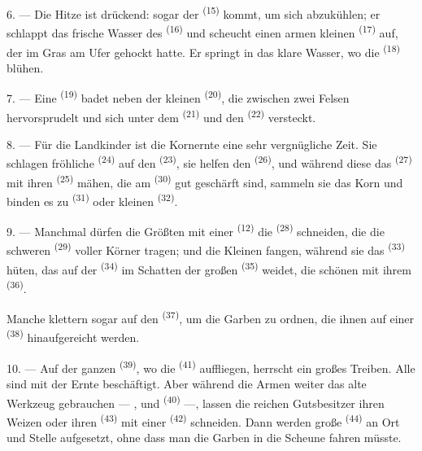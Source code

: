 6. --- Die Hitze ist drückend: sogar der  \textsuperscript{(15)} kommt,
um sich abzukühlen; er schlappt das frische Wasser des 
\textsuperscript{(16)} und scheucht einen armen kleinen 
\textsuperscript{(17)} auf, der im Gras am Ufer gehockt hatte. Er springt in das
klare Wasser, wo die  \textsuperscript{(18)} blühen.

7. --- Eine  \textsuperscript{(19)} badet neben der kleinen
 \textsuperscript{(20)}, die zwischen zwei Felsen hervorsprudelt und
sich unter dem  \textsuperscript{(21)} und den
 \textsuperscript{(22)} versteckt.

\VUsaut{5.0mm}
\VUsaut{3.4mm}

8. --- Für die Landkinder ist die Kornernte eine sehr vergnügliche Zeit. Sie
schlagen fröhliche  \textsuperscript{(24)} auf den
 \textsuperscript{(23)}, sie helfen den 
\textsuperscript{(26)}, und während diese das 
\textsuperscript{(27)} mit ihren  \textsuperscript{(25)} mähen, die am
 \textsuperscript{(30)} gut geschärft sind, sammeln sie das Korn
und binden es zu  \textsuperscript{(31)} oder kleinen
 \textsuperscript{(32)}.

9. --- Manchmal dürfen die Größten mit einer  \textsuperscript{(12)}
die  \textsuperscript{(28)} schneiden, die die schweren
 \textsuperscript{(29)} voller Körner tragen; und die Kleinen fangen,
während sie das  \textsuperscript{(33)} hüten, das auf der
 \textsuperscript{(34)} im Schatten der großen 
\textsuperscript{(35)} weidet, die schönen  mit ihrem
 \textsuperscript{(36)}.

Manche klettern sogar auf den  \textsuperscript{(37)}, um die Garben zu
ordnen, die ihnen auf einer  \textsuperscript{(38)} hinaufgereicht
werden.

10. --- Auf der ganzen  \textsuperscript{(39)}, wo die 
\textsuperscript{(41)} auffliegen, herrscht ein großes Treiben. Alle sind mit der
Ernte beschäftigt. Aber während die Armen weiter das alte Werkzeug gebrauchen ---
,  und 
\textsuperscript{(40)} ---, lassen die reichen Gutsbesitzer ihren Weizen oder ihren
 \textsuperscript{(43)} mit einer 
\textsuperscript{(42)} schneiden. Dann werden große 
\textsuperscript{(44)} an Ort und Stelle aufgesetzt, ohne dass man die Garben in die
Scheune fahren müsste.

